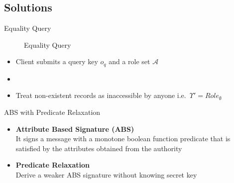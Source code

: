 \documentclass[xcolor={dvipsnames},aspectratio=169,10pt]{beamer}
\begin{document}
\subsection{Solutions}

\begin{frame}{Equality Query}
  \begin{figure}
    \resizebox{.9\linewidth}{!}{}
    \caption{Equality Query}
  \end{figure}
  \begin{itemize}
    \item<1-> Client submits a query key $o_q$ and a role set $\mathcal{A}$
    \item<4-> 
    \item<5-> Treat non-existent records as \alert{inaccessible by anyone} i.e.\ $\Upsilon' = {Role}_{\emptyset}$
  \end{itemize}
\end{frame}

\begin{frame}{ABS with Predicate Relaxation}
  \begin{itemize}
    \item<+-> \textbf{Attribute Based Signature (ABS)}~\cite{10.1007/978-3-642-19074-2_24} \\
      \small{It signs a message with a monotone boolean function predicate that is satisfied by the attributes obtained from the authority}
      \begin{figure}
        \resizebox{.85\linewidth}{!}{}
      \end{figure}
    \item<+-> \textbf{Predicate Relaxation} \\
      \small{Derive a \alert{weaker} ABS signature without knowing secret key}
      \begin{figure}
        \resizebox{.85\linewidth}{!}{}
      \end{figure}
  \end{itemize}
\end{frame}
\end{document}
